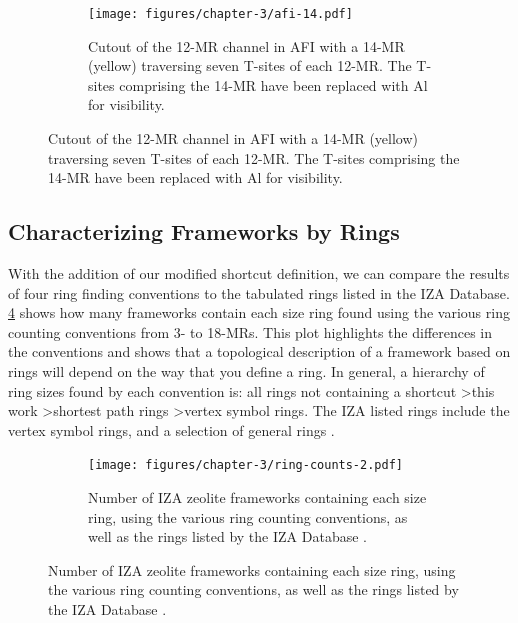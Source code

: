 \documentclass[preprint,numrefs,noinfo,sort&compress]{elsarticle}
\begin{document}
\begin{figure}
\begin{figure}[H]
\centering
\texttt{[image: figures/chapter-3/afi-14.pdf]}
\caption{Cutout of the 12-MR channel in AFI with a 14-MR (yellow) traversing seven T-sites of each 12-MR. The T-sites comprising the 14-MR have been replaced with Al for visibility. \label{fig:afi-14}}
\end{figure}
\end{figure}

\subsection{Characterizing Frameworks by Rings}
\label{sec:org3c3c2d3}
With the addition of our modified shortcut definition, we can compare the results of four ring finding conventions to the tabulated rings listed in the IZA Database. \cref{fig:ring-counts} shows how many frameworks contain each size ring found using the various ring counting conventions from 3- to 18-MRs. This plot highlights the differences in the conventions and shows that a topological description of a framework based on rings will depend on the way that you define a ring. In general, a hierarchy of ring sizes found by each convention is: all rings not containing a shortcut \textgreater this work \textgreater shortest path rings \textgreater vertex symbol rings. The IZA listed rings include the vertex symbol rings, and a selection of general rings \cite{baerlocher-database-nodate}.  

\begin{figure}
\begin{figure}[H]
\centering
\texttt{[image: figures/chapter-3/ring-counts-2.pdf]}
\caption{Number of IZA zeolite frameworks containing each size ring, using the various ring counting conventions, as well as the rings listed by the IZA Database \cite{baerlocher-database-nodate}. \label{fig:ring-counts}}
\end{figure}
\end{figure}
\end{document}
